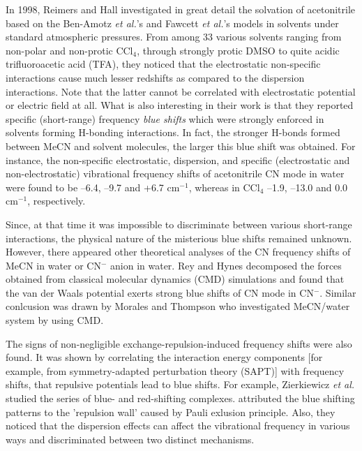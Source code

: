 \documentclass[a4paper,titlepage,twoside,fleqn,12pt]{book}
\begin{document}
\begin{refsection}
In 1998, Reimers and Hall \citep{Reimers.Hall.JACS.1999} investigated in great detail the solvation of acetonitrile 
based on the Ben-Amotz \emph{et al.}'s and Fawcett \emph{et al.}'s models in solvents under standard atmospheric pressures. 
From among 33 various solvents ranging from non\hyp{}polar and non\hyp{}protic CCl$_4$, 
through strongly protic
DMSO to quite acidic trifluoroacetic acid (TFA), they noticed that the electrostatic
non\hyp{}specific interactions cause much lesser redshifts as compared to the dispersion
interactions. Note that the latter cannot be correlated with electrostatic potential
or electric field at all. What is also interesting in their work is that they 
reported specific (short\hyp{}range) frequency \emph{blue shifts} which were strongly enforced
in solvents forming H-bonding interactions. In fact, the stronger H-bonds formed between MeCN
and solvent molecules, the larger this blue shift was obtained. For instance,
the non\hyp{}specific electrostatic, dispersion, and specific (electrostatic
and non\hyp{}electrostatic) vibrational frequency shifts of acetonitrile CN mode
in water were found to be --6.4, --9.7 and +6.7 cm$^{-1}$, whereas in CCl$_4$
--1.9, --13.0 and 0.0 cm$^{-1}$, respectively.

Since, at that time it was impossible to discriminate between various short\hyp{}range
interactions, the physical nature of the misterious blue shifts remained unknown.
However, there appeared other theoretical analyses of the CN frequency shifts of MeCN in water
or CN$^-$ anion in water. Rey and Hynes\citep{Rey.Hynes.JCP.1998} decomposed the forces obtained from classical molecular dynamics
(CMD) simulations and found that the van der Waals potential exerts strong blue shifts of CN mode in CN$^-$.
Similar conlcusion was drawn by Morales and Thompson who investigated MeCN/water system by 
using CMD.\citep{Morales.Thompson.JPCB.2011}

The signs of non\hyp{}negligible exchange\hyp{}repulsion\hyp{}induced frequency shifts were
also  
found.\citep{Li.Liu.Schlegel.JACS.2002,Delanoye.Herrebout.vanderVeken.JACS.2002,Zierkiewicz.Jurecka.Hobza.ChemPhysChem.2005,
Rodziewicz.Rutkowski.Melikova.Koll.ChemPhysChem.2005,
Zhou.Qiu.JPCA.2009,Mo.Wang.Guan.Braida.Hiberty.Wu.ChemEurJ.2014}
It was shown by correlating the interaction
energy components [for example, from symmetry\hyp{}adapted 
perturbation theory\citep{Jeziorski.Moszynski.Szalewicz.ChemRev.1994} (SAPT)] with frequency shifts, that repulsive potentials
lead to blue shifts. For example, Zierkiewicz \emph{et al.} studied the series of 
blue\hyp{} and red\hyp{}shifting complexes.\citep{Zierkiewicz.Jurecka.Hobza.ChemPhysChem.2005} 
attributed the
blue shifting patterns to the 'repulsion wall' caused by Pauli exlusion principle. 
Also, they noticed that
the dispersion effects can affect the vibrational frequency in various ways
and discriminated between two distinct mechanisms.


\end{refsection}
\end{document}

